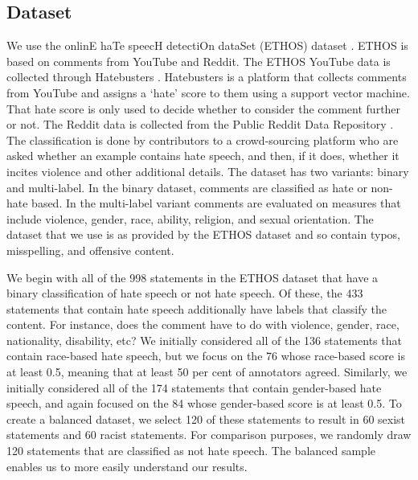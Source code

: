 \documentclass{bmcart}
\begin{document}
\subsection{Dataset}\label{dataset}

We use the onlinE haTe speecH detectiOn dataSet (ETHOS) dataset \cite{mollas2020ethos}. ETHOS is based on comments from YouTube and Reddit. The ETHOS YouTube data is collected through Hatebusters \cite{anagnostou2018hatebusters}. Hatebusters is a platform that collects comments from YouTube and assigns a `hate' score to them using a support vector machine. That hate score is only used to decide whether to consider the comment further or not. The Reddit data is collected from the Public Reddit Data Repository \cite{baumgartner2020pushshift}. The classification is done by contributors to a crowd-sourcing platform who are asked whether an example contains hate speech, and then, if it does, whether it incites violence and other additional details. The dataset has two variants: binary and multi-label. In the binary dataset, comments are classified as hate or non-hate based. In the multi-label variant comments are evaluated on measures that include violence, gender, race, ability, religion, and sexual orientation. The dataset that we use is as provided by the ETHOS dataset and so contain typos, misspelling, and offensive content.

We begin with all of the 998 statements in the ETHOS dataset that have a binary classification of hate speech or not hate speech. Of these, the 433 statements that contain hate speech additionally have labels that classify the content. For instance, does the comment have to do with violence, gender, race, nationality, disability, etc? We initially considered all of the 136 statements that contain race-based hate speech, but we focus on the 76 whose race-based score is at least 0.5, meaning that at least 50 per cent of annotators agreed. Similarly, we initially considered all of the 174 statements that contain gender-based hate speech, and again focused on the 84 whose gender-based score is at least 0.5. To create a balanced dataset, we select 120 of these statements to result in 60 sexist statements and 60 racist statements. For comparison purposes, we randomly draw 120 statements that are classified as not hate speech. The balanced sample enables us to more easily understand our results.
\end{document}
